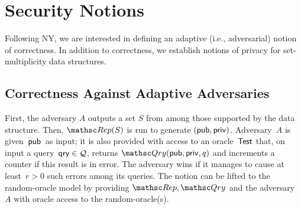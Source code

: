 
\section{Security Notions}
\label{sec:security-notions}
Following NY, we are interested in defining an adaptive (i.e.,
adversarial) notion of correctness.
In addition to correctness, we establish notions of privacy for
set-multiplicity data structures.




\subsection{Correctness Against Adaptive Adversaries}

First, the adversary $A$ outputs a set $S$ from among those supported by
the data structure. Then,
$\Rep(S)$ is run to generate $({\sf pub},{\sf priv})$.
Adversary~$A$ is given~${\sf pub}$~as input; it is also
provided with access to an oracle~$\mathsf{Test}$ that, on input a query~$\mathsf{qry} \in {\cal Q}$,
returns $\Qry(\pubaux,\privaux,q)$ and increments
a counter if this result is in error.  The adversary wins if it
manages to cause at least~$r>0$ such errors among its queries.
The notion can be lifted to the random-oracle model by providing
$\Rep,\Qry$ and the adversary~$A$ with oracle access to the
random-oracle(s).

